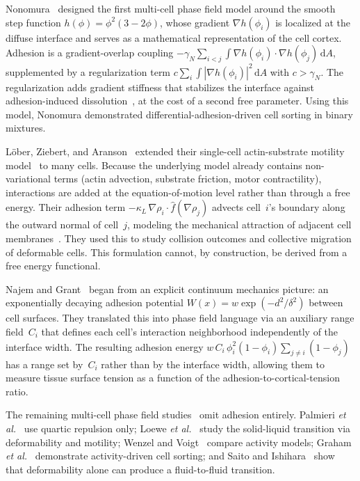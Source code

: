 \documentclass[aps,pre,twocolumn,superscriptaddress,longbibliography,floatfix]{revtex4-2}
\newcommand{\dd}{\mathrm{d}}               %
\newcommand{\phii}{\phi_i}                 %
\newcommand{\phij}{\phi_j}                 %
\begin{document}
Nonomura~\cite{Nonomura2012} designed the first multi-cell phase field
model around the smooth step function $h(\phi) = \phi^2(3 - 2\phi)$, whose
gradient $\nabla h(\phii)$ is localized at the diffuse interface and
serves as a mathematical representation of the cell cortex.
Adhesion is a gradient-overlap coupling
$-\gamma_N\sum_{i<j}\!\int\!\nabla h(\phii)\!\cdot\!\nabla h(\phij)\,\dd A$,
supplemented by a regularization term
$c \sum_i \int |\nabla h(\phii)|^2 \, \dd A$ with $c > \gamma_N$.
The regularization adds gradient stiffness that stabilizes the interface
against adhesion-induced dissolution~\cite{Nonomura2012}, at the cost of a
second free parameter.  Using this model, Nonomura demonstrated
differential-adhesion-driven cell sorting in binary mixtures.

L\"ober, Ziebert, and Aranson~\cite{Lober2015} extended their single-cell
actin-substrate motility model~\cite{Ziebert2012} to many cells.  Because
the underlying model already contains non-variational terms (actin
advection, substrate friction, motor contractility), interactions are added
at the equation-of-motion level rather than through a free energy.  Their
adhesion term
$-\kappa_L\,\nabla\rho_i \!\cdot\! \hat{f}(\nabla\rho_j)$
advects cell~$i$'s boundary along the outward normal of cell~$j$,
modeling the mechanical attraction of adjacent cell
membranes~\cite{Lober2015}.  They used this to study
collision outcomes and collective migration of deformable cells.
This formulation cannot, by construction, be derived from a free energy
functional.

Najem and Grant~\cite{Najem2016} began from an explicit continuum
mechanics picture: an exponentially decaying adhesion potential
$W(x) = w\exp(-d^2/\delta^2)$ between cell surfaces.  They translated
this into phase field language via an auxiliary range field~$C_i$ that
defines each cell's interaction neighborhood independently of the
interface width.  The resulting adhesion energy
$w\,C_i\,\phii^2(1 - \phii)\sum_{j\neq i}(1 - \phij)$
has a range set by~$C_i$ rather than by the interface width, allowing
them to measure tissue surface tension as a function of the
adhesion-to-cortical-tension ratio.

The remaining multi-cell phase field
studies~\cite{Palmieri2015,Loewe2020,Wenzel2021,Graham2024,Saito2024} omit
adhesion entirely.  Palmieri \textit{et al.}~\cite{Palmieri2015} use
quartic repulsion only; Loewe \textit{et al.}~\cite{Loewe2020} study
the solid-liquid transition via deformability and motility;
Wenzel and Voigt~\cite{Wenzel2021} compare activity models;
Graham \textit{et al.}~\cite{Graham2024} demonstrate activity-driven
cell sorting; and Saito and Ishihara~\cite{Saito2024} show that
deformability alone can produce a fluid-to-fluid transition.
\end{document}
